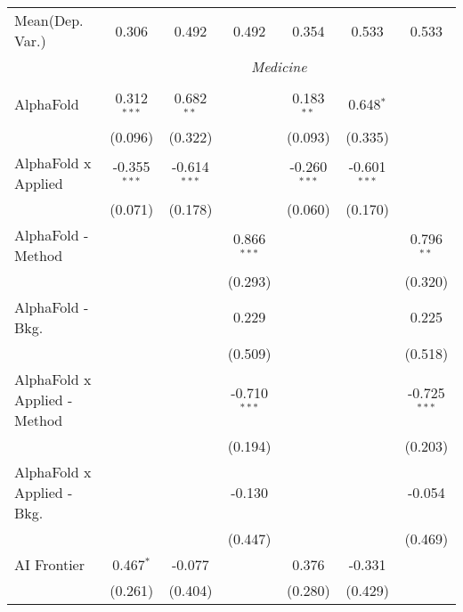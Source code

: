 \begin{tabular}{lcccccc}
Mean(Dep. Var.) & 0.306 & 0.492 & 0.492 & 0.354 & 0.533 & 0.533 \\
 & \multicolumn{6}{c}{\textit{Medicine}} \\ \\
   AlphaFold                      & 0.312$^{***}$  & 0.682$^{**}$   &                & 0.183$^{**}$   & 0.648$^{*}$    &   \\   
                                  & (0.096)        & (0.322)        &                & (0.093)        & (0.335)        &   \\   
   AlphaFold x Applied            & -0.355$^{***}$ & -0.614$^{***}$ &                & -0.260$^{***}$ & -0.601$^{***}$ &   \\   
                                  & (0.071)        & (0.178)        &                & (0.060)        & (0.170)        &   \\   
   AlphaFold - Method             &                &                & 0.866$^{***}$  &                &                & 0.796$^{**}$\\   
                                  &                &                & (0.293)        &                &                & (0.320)\\   
   AlphaFold - Bkg.               &                &                & 0.229          &                &                & 0.225\\   
                                  &                &                & (0.509)        &                &                & (0.518)\\   
   AlphaFold x Applied - Method   &                &                & -0.710$^{***}$ &                &                & -0.725$^{***}$\\   
                                  &                &                & (0.194)        &                &                & (0.203)\\   
   AlphaFold x Applied - Bkg.     &                &                & -0.130         &                &                & -0.054\\   
                                  &                &                & (0.447)        &                &                & (0.469)\\   
   AI Frontier                    & 0.467$^{*}$    & -0.077         &                & 0.376          & -0.331         &   \\   
                                  & (0.261)        & (0.404)        &                & (0.280)        & (0.429)        &   \\   

\end{tabular}
